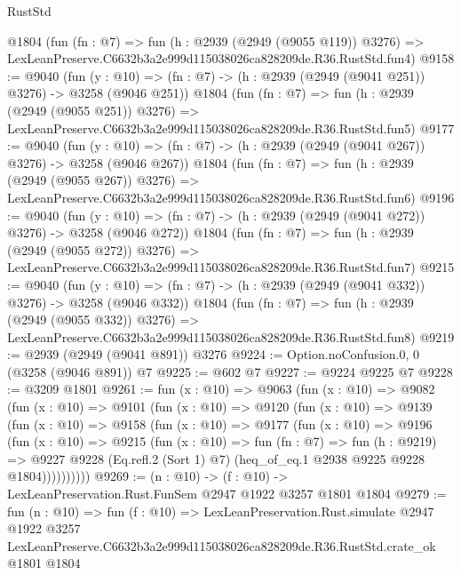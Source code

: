 \begin{lexlean}{RustStd}
\begin{coremodule}
    @1804
    (fun (fn : @7) =>
    fun (h : @2939 (@2949 (@9055 @119)) @3276) =>
    LexLeanPreserve.C6632b3a2e999d115038026ca828209de.R36.RustStd.fun4)
@9158 := @9040
    (fun (y : @10) => (fn : @7) -> (h : @2939 (@2949 (@9041 @251)) @3276) -> @3258 (@9046 @251))
    @1804
    (fun (fn : @7) =>
    fun (h : @2939 (@2949 (@9055 @251)) @3276) =>
    LexLeanPreserve.C6632b3a2e999d115038026ca828209de.R36.RustStd.fun5)
@9177 := @9040
    (fun (y : @10) => (fn : @7) -> (h : @2939 (@2949 (@9041 @267)) @3276) -> @3258 (@9046 @267))
    @1804
    (fun (fn : @7) =>
    fun (h : @2939 (@2949 (@9055 @267)) @3276) =>
    LexLeanPreserve.C6632b3a2e999d115038026ca828209de.R36.RustStd.fun6)
@9196 := @9040
    (fun (y : @10) => (fn : @7) -> (h : @2939 (@2949 (@9041 @272)) @3276) -> @3258 (@9046 @272))
    @1804
    (fun (fn : @7) =>
    fun (h : @2939 (@2949 (@9055 @272)) @3276) =>
    LexLeanPreserve.C6632b3a2e999d115038026ca828209de.R36.RustStd.fun7)
@9215 := @9040
    (fun (y : @10) => (fn : @7) -> (h : @2939 (@2949 (@9041 @332)) @3276) -> @3258 (@9046 @332))
    @1804
    (fun (fn : @7) =>
    fun (h : @2939 (@2949 (@9055 @332)) @3276) =>
    LexLeanPreserve.C6632b3a2e999d115038026ca828209de.R36.RustStd.fun8)
@9219 := @2939 (@2949 (@9041 @891)) @3276
@9224 := Option.noConfusion.{0, 0} (@3258 (@9046 @891)) @7
@9225 := @602 @7
@9227 := @9224 @9225 @7
@9228 := @3209 @1801
@9261 := fun (x : @10) =>
  @9063
    (fun (x : @10) =>
    @9082
      (fun (x : @10) =>
      @9101
        (fun (x : @10) =>
        @9120
          (fun (x : @10) =>
          @9139
            (fun (x : @10) =>
            @9158
              (fun (x : @10) =>
              @9177
                (fun (x : @10) =>
                @9196
                  (fun (x : @10) =>
                  @9215
                    (fun (x : @10) =>
                    fun (fn : @7) =>
                    fun (h : @9219) =>
                    @9227
                      @9228
                      (Eq.refl.{2} (Sort 1) @7)
                      (heq_of_eq.{1} @2938 @9225 @9228 @1804))))))))))
@9269 := (n : @10) -> (f : @10) -> LexLeanPreservation.Rust.FunSem @2947 @1922 @3257 @1801 @1804
@9279 := fun (n : @10) =>
  fun (f : @10) =>
  LexLeanPreservation.Rust.simulate
    @2947
    @1922
    @3257
    LexLeanPreserve.C6632b3a2e999d115038026ca828209de.R36.RustStd.crate_ok
    @1801
    @1804
\end{coremodule}
\end{lexlean}
